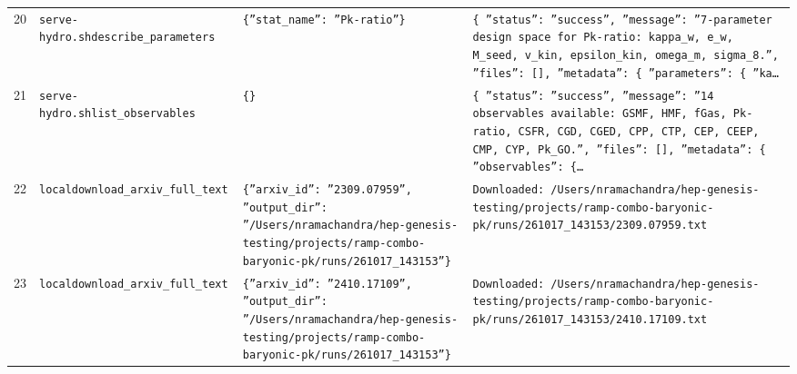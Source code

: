 \documentclass[11pt,a4paper]{article}
\begin{document}
\begin{longtable}{@{}p{}p{}p{}p{}@{}}
20 & \texttt{serve-hydro.sh}\newline\texttt{describe\_\allowbreak{}parameters} & \texttt{\{''stat\_\allowbreak{}name'':\allowbreak{} ''Pk-ratio''\}\allowbreak{}} & \texttt{\{   ''status'':\allowbreak{} ''success'',\allowbreak{}   ''message'':\allowbreak{} ''7-parameter design space for Pk-ratio:\allowbreak{} kappa\_\allowbreak{}w,\allowbreak{} e\_\allowbreak{}w,\allowbreak{} M\_\allowbreak{}seed,\allowbreak{} v\_\allowbreak{}kin,\allowbreak{} epsilon\_\allowbreak{}kin,\allowbreak{} omega\_\allowbreak{}m,\allowbreak{} sigma\_\allowbreak{}8.'',\allowbreak{}   ''files'':\allowbreak{} []\allowbreak{},\allowbreak{}   ''metadata'':\allowbreak{} \{     ''parameters'':\allowbreak{} \{       ''ka\ldots{}\allowbreak{}} \\
21 & \texttt{serve-hydro.sh}\newline\texttt{list\_\allowbreak{}observables} & \texttt{\{\}\allowbreak{}} & \texttt{\{   ''status'':\allowbreak{} ''success'',\allowbreak{}   ''message'':\allowbreak{} ''14 observables available:\allowbreak{} GSMF,\allowbreak{} HMF,\allowbreak{} fGas,\allowbreak{} Pk-ratio,\allowbreak{} CSFR,\allowbreak{} CGD,\allowbreak{} CGED,\allowbreak{} CPP,\allowbreak{} CTP,\allowbreak{} CEP,\allowbreak{} CEEP,\allowbreak{} CMP,\allowbreak{} CYP,\allowbreak{} Pk\_\allowbreak{}GO.'',\allowbreak{}   ''files'':\allowbreak{} []\allowbreak{},\allowbreak{}   ''metadata'':\allowbreak{} \{     ''observables'':\allowbreak{} \{\ldots{}\allowbreak{}} \\
22 & \texttt{local}\newline\texttt{download\_\allowbreak{}arxiv\_\allowbreak{}full\_\allowbreak{}text} & \texttt{\{''arxiv\_\allowbreak{}id'':\allowbreak{} ''2309.07959'',\allowbreak{} ''output\_\allowbreak{}dir'':\allowbreak{} ''/\allowbreak{}Users/\allowbreak{}nramachandra/\allowbreak{}hep-genesis-testing/\allowbreak{}projects/\allowbreak{}ramp-combo-baryonic-pk/\allowbreak{}runs/\allowbreak{}261017\_\allowbreak{}143153''\}\allowbreak{}} & \texttt{Downloaded:\allowbreak{} /\allowbreak{}Users/\allowbreak{}nramachandra/\allowbreak{}hep-genesis-testing/\allowbreak{}projects/\allowbreak{}ramp-combo-baryonic-pk/\allowbreak{}runs/\allowbreak{}261017\_\allowbreak{}143153/\allowbreak{}2309.07959.txt} \\
23 & \texttt{local}\newline\texttt{download\_\allowbreak{}arxiv\_\allowbreak{}full\_\allowbreak{}text} & \texttt{\{''arxiv\_\allowbreak{}id'':\allowbreak{} ''2410.17109'',\allowbreak{} ''output\_\allowbreak{}dir'':\allowbreak{} ''/\allowbreak{}Users/\allowbreak{}nramachandra/\allowbreak{}hep-genesis-testing/\allowbreak{}projects/\allowbreak{}ramp-combo-baryonic-pk/\allowbreak{}runs/\allowbreak{}261017\_\allowbreak{}143153''\}\allowbreak{}} & \texttt{Downloaded:\allowbreak{} /\allowbreak{}Users/\allowbreak{}nramachandra/\allowbreak{}hep-genesis-testing/\allowbreak{}projects/\allowbreak{}ramp-combo-baryonic-pk/\allowbreak{}runs/\allowbreak{}261017\_\allowbreak{}143153/\allowbreak{}2410.17109.txt} \\

\end{longtable}
\end{document}
